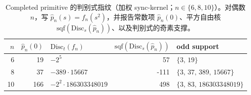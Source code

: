 \begin{table}[H]
\centering
\scriptsize
\setlength{\tabcolsep}{6pt}
\caption{Completed primitive 的判别式指纹（加权 sync-kernel；$n\in\{6,8,10\}$）。对偶数 $n$，写 $\widehat p_n(s)=f_n(s^2)$，并报告常数项 $\widehat p_n(0)$、平方自由核 $\mathrm{sqf}(\mathrm{Disc}_s(\widehat p_n))$、以及判别式的奇素支撑。}
\label{tab:sync_kernel_weighted_primitive_completed_discriminant_fingerprint}
\begin{tabular}{r r l r l}
\toprule
$n$ & $\widehat p_n(0)$ & $\mathrm{Disc}_t(f_n)$ & $\mathrm{sqf}(\mathrm{Disc}_s(\widehat p_n))$ & odd support\\
\midrule
6 & 19 & $-2^{5}$ & 57 & $\{3,\,19\}$\\
8 & 37 & $-389\cdot 15667$ & -111 & $\{3,\,37,\,389,\,15667\}$\\
10 & 166 & $-2^{2}\cdot 186303348019$ & 498 & $\{3,\,83,\,186303348019\}$\\
\bottomrule
\end{tabular}
\end{table}

